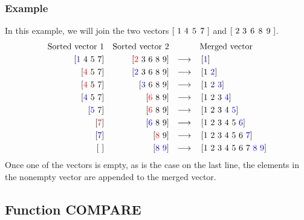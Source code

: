 \documentclass[oneside,12pt]{book}
\begin{document}
\subsubsection*{Example}
In this example, we will join the two vectors $[ \ 1 \ 4 \hspace{0.06125in} 5 \hspace{0.06125in} 7  \ ]$ and 
$[ \ 2 \ 3 \hspace{0.06125in} 6 \hspace{0.06125in} 8 \hspace{0.06125in} 9  \ ]$.
\begin{align*}
\text{Sorted vector 1} && \text{Sorted vector 2} &&&  \quad  \text{Merged vector}\\
\left[ {\color{blue} 1} \ 4 \ 5 \ 7 \right] && \left[ {\color{red} 2} \ 3 \ 6 \ 8 \ 9 \right] && \longrightarrow & \quad \left[{\color{blue} 1}\right]\\
\left[ {\color{red}4} \ 5 \ 7 \right] && \left[ {\color{blue} 2} \ 3 \ 6 \ 8 \ 9 \right] &&\longrightarrow & \quad \left[1 \ {\color{blue} 2} \right]\\
\left[ {\color{red} 4} \ 5 \ 7 \right] && \left[  {\color{blue} 3} \ 6 \ 8 \ 9 \right] &&\longrightarrow & \quad  \left[1 \ 2 \ {\color{blue} 3} \right]\\
\left[ {\color{blue} 4} \ 5 \ 7 \right] && \left[   {\color{red} 6} \ 8 \ 9 \right] &&\longrightarrow & \quad  \left[1 \ 2 \ 3 \ {\color{blue} 4} \right]\\
\left[ {\color{blue} 5} \ 7 \right] && \left[   {\color{red} 6} \ 8 \ 9 \right] &&\longrightarrow & \quad  \left[1 \ 2 \ 3 \ 4 \ {\color{blue} 5} \right]\\
\left[  {\color{red}7} \right] && \left[   {\color{blue} 6} \ 8 \ 9 \right] &&\longrightarrow & \quad  \left[1 \ 2 \ 3 \ 4 \ 5 \ {\color{blue} 6} \right]\\
\left[  {\color{blue}7} \right] && \left[  {\color{red}8} \ 9 \right] &&\longrightarrow & \quad  \left[1 \ 2 \ 3 \ 4 \ 5 \ 6 \ {\color{blue} 7} \right]\\
\left[ \  \right] && \left[  {\color{blue}8 \ 9} \right] &&\longrightarrow & \quad  \left[1 \ 2 \ 3 \ 4 \ 5 \ 6 \ 7 \ {\color{blue} 8 \ 9} \right]\\
\end{align*}
Once one of the vectors is empty, as is the case on the last line, the elements in the nonempty vector are appended to the merged vector.

\subsection{Function COMPARE}
\end{document}
